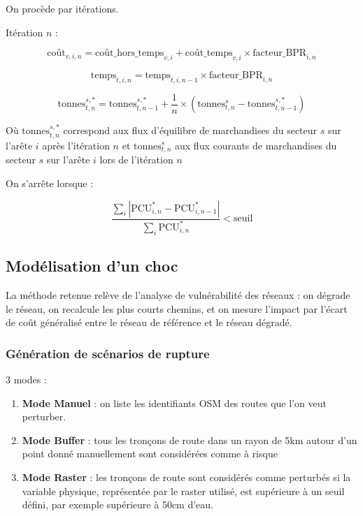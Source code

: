 \documentclass[12pt,a4paper,french]{report}
\begin{document}
	On procède par itérations.
	
	Itération $n$ :
	
	\begin{equation}
		\text{coût}_{v,i,n} = \text{coût\_hors\_temps}_{v,i} + \text{coût\_temps}_{v,i} \times \text{facteur\_BPR}_{i,n}
	\end{equation}
	
	\begin{equation}
		\text{temps}_{t,i,n} = \text{temps}_{t,i,n-1} \times \text{facteur\_BPR}_{i,n}
	\end{equation}
	
	\begin{equation}
		\text{tonnes}_{t,n}^{s,*} = \text{tonnes}_{t,n-1}^{s,*} + \frac{1}{n} \times (\text{tonnes}_{t,n}^s - \text{tonnes}_{t,n-1}^{s,*})
	\end{equation}
	
	Où $\text{tonnes}_{t,n}^{s,*}$ correspond aux flux d'équilibre de marchandises du secteur $s$ sur l'arête $i$ après l'itération $n$ et $\text{tonnes}_{t,n}^s$ aux flux courants de marchandises du secteur $s$ sur l'arête $i$ lors de l'itération $n$
	\medskip

	
	On s'arrête lorsque :
	
	\begin{equation}
		\frac{\sum_i |\text{PCU}_{i,n}^* - \text{PCU}_{i,n-1}^*|}{\sum_i \text{PCU}_{i,n}^*} < \text{seuil}
	\end{equation}

	
	\subsection{Modélisation d'un choc}
	\label{subsec:choc}

	La méthode retenue relève de l'analyse de vulnérabilité des réseaux : on dégrade le réseau, on recalcule les plus courts chemins, et on mesure l'impact par l'écart de coût généralisé entre le réseau de référence et le réseau dégradé. 

	\subsubsection{Génération de scénarios de rupture}
	\label{subsubsec:scenarios}

	3 modes :
	
	\begin{enumerate}
		\item \textbf{Mode Manuel} : on liste les identifiants OSM des routes que l'on veut perturber.
		\item \textbf{Mode Buffer} : tous les tronçons de route dans un rayon de 5km autour d'un point donné manuellement sont considérées comme à risque
		\item \textbf{Mode Raster} : les tronçons de route sont considérés comme perturbés si la variable physique, représentée par le raster utilisé, est supérieure à un seuil défini, par exemple supérieure à 50cm d'eau.
	\end{enumerate}
	
\end{document}
